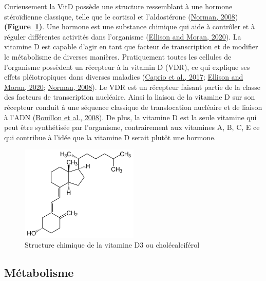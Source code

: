 \documentclass[
  letterpaper,
  DIV=11,
  numbers=noendperiod]{scrartcl}
\begin{document}
Curieusement la VitD possède une structure ressemblant à une hormone
stéroïdienne classique, telle que le cortisol et l'aldostérone
(\protect\hyperlink{ref-Norman.2008}{Norman, 2008})
\textbf{(Figure~\ref{fig-vitd3})}. Une hormone est une substance
chimique qui aide à contrôler et à réguler différentes activités dans
l'organisme (\protect\hyperlink{ref-Ellison.2020}{Ellison and Moran,
2020}). La vitamine D est capable d'agir en tant que facteur de
transcription et de modifier le métabolisme de diverses manières.
Pratiquement toutes les cellules de l'organisme possèdent un récepteur à
la vitamin D (VDR), ce qui explique ses effets pléiotropiques dans
diverses maladies (\protect\hyperlink{ref-Caprio.2017}{Caprio et al.,
2017}; \protect\hyperlink{ref-Ellison.2020}{Ellison and Moran, 2020};
\protect\hyperlink{ref-Norman.2008}{Norman, 2008}). Le VDR est un
récepteur faisant partie de la classe des facteurs de transcription
nucléaire. Ainsi la liaison de la vitamine D sur son récepteur conduit à
une séquence classique de translocation nucléaire et de liaison à l'ADN
(\protect\hyperlink{ref-Bouillon.2008}{Bouillon et al., 2008}). De plus,
la vitamine D est la seule vitamine qui peut être synthétisée par
l'organisme, contrairement aux vitamines A, B, C, E ce qui contribue à
l'idée que la vitamine D serait plutôt une hormone.

\begin{figure}

{\centering \includegraphics[width=0.5\textwidth,height=\textheight]{figures/vitamin-d3.png}

}

\caption{\label{fig-vitd3}Structure chimique de la vitamine D3 ou
cholécalciférol}

\end{figure}

\hypertarget{muxe9tabolisme}{%
\subsection{Métabolisme}\label{muxe9tabolisme}}
\end{document}
